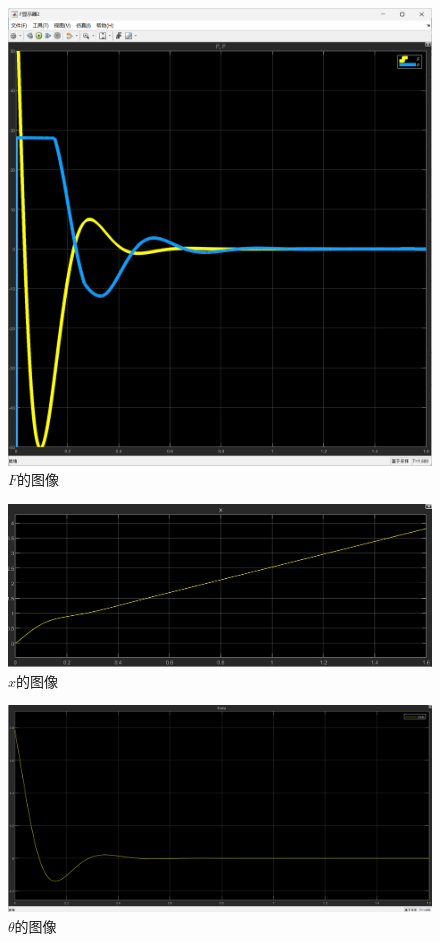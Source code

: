 \documentclass[12pt,a4paper,UTF8]{article}
\begin{document}
\begin{figure}[htbp]
    \centering
    \includegraphics[width=0.8\linewidth]{figures/f.png}
    \caption{$F$的图像}
    \label{F-1}
\end{figure}

\begin{figure}[htbp]
    \centering
    \includegraphics[width=0.8\linewidth]{figures/x.png}
    \caption{$x$的图像}
    \label{x-1}
\end{figure}

\begin{figure}[htbp]
    \centering
    \includegraphics[width=0.8\linewidth]{figures/theta.png}
    \caption{$\theta$的图像}
    \label{theta-1}
\end{figure}
\end{document}
